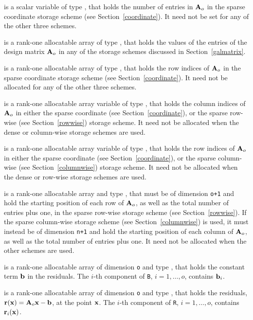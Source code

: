 \documentclass{galahad}
\begin{document}
\begin{description}
\begin{description}
 is a scalar variable of type \integer, that
holds the number of entries in ${\mathbf{A}}_o$
in the sparse coordinate storage scheme (see Section~\ref{coordinate}).
It need not be set for any of the other three schemes.

 is a rank-one allocatable array of type \realdp, that 
holds the values of the entries of the design matrix ${\mathbf{A}}_o$ in any of the
storage schemes discussed in Section~\ref{galmatrix}.

 is a rank-one allocatable array of type \integer,
that holds the row indices of ${\mathbf{A}}_o$ in the sparse coordinate storage
scheme (see Section~\ref{coordinate}).
It need not be allocated for any of the other three schemes.

 is a rank-one allocatable array variable of type \integer,
that holds the column indices of ${\mathbf{A}}_o$ in either the sparse coordinate
(see Section~\ref{coordinate}), or the sparse row-wise
(see Section~\ref{rowwise}) storage scheme.
It need not be allocated when the dense or column-wise storage schemes are used.

 is a rank-one allocatable array variable of type \integer,
that holds the row indices of ${\mathbf{A}}_o$ in either the sparse coordinate
(see Section~\ref{coordinate}), or the sparse column-wise
(see Section~\ref{columnwise}) storage scheme.
It need not be allocated when the dense or row-wise storage schemes are used.

 is a rank-one allocatable array and type \integer,
that must be of dimension {\tt o+1}
and hold the starting position of each row of ${\mathbf{A}}_o$, as well
as the total number of entries plus one, in the sparse row-wise storage
scheme (see Section~\ref{rowwise}).
If the sparse column-wise storage scheme (see Section~\ref{columnwise})
is used, it must instead be of dimension {\tt n+1}
and hold the starting position of each column of ${\mathbf{A}}_o$, as well
as the total number of entries plus one.
It need not be allocated when the
other schemes are used.

\end{description}

 is a rank-one allocatable array of dimension {\tt o} and type
\realdp, that holds the constant term ${\mathbf{b}}$ in the residuals.
The $i$-th component of {\tt B}, $i = 1, \ldots, o$, contains ${\mathbf{b}}_{i}$.

 is a rank-one allocatable array of dimension {\tt o} and type
\realdp, that holds the residuals, ${\mathbf{r}}({\mathbf{x}}) = {\mathbf{A}}_o {\mathbf{x}} - {\mathbf{b}}$,
at the point ${\mathbf{x}}$. The $i$-th component of
{\tt R}, $i = 1, \ldots, o$, contains ${\mathbf{r}}_{i}({\mathbf{x}})$.


\end{description}
\end{document}

